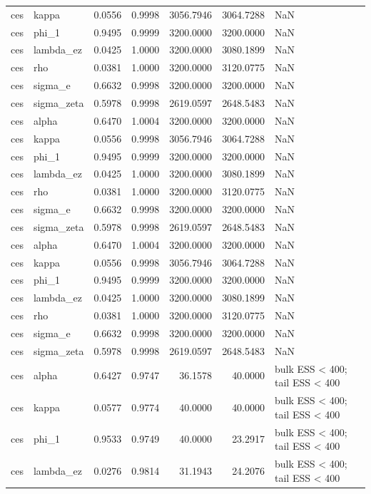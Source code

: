 \begin{tabular}{llrrrrl}
ces & kappa & 0.0556 & 0.9998 & 3056.7946 & 3064.7288 & NaN \\
ces & phi\_1 & 0.9495 & 0.9999 & 3200.0000 & 3200.0000 & NaN \\
ces & lambda\_ez & 0.0425 & 1.0000 & 3200.0000 & 3080.1899 & NaN \\
ces & rho & 0.0381 & 1.0000 & 3200.0000 & 3120.0775 & NaN \\
ces & sigma\_e & 0.6632 & 0.9998 & 3200.0000 & 3200.0000 & NaN \\
ces & sigma\_zeta & 0.5978 & 0.9998 & 2619.0597 & 2648.5483 & NaN \\
ces & alpha & 0.6470 & 1.0004 & 3200.0000 & 3200.0000 & NaN \\
ces & kappa & 0.0556 & 0.9998 & 3056.7946 & 3064.7288 & NaN \\
ces & phi\_1 & 0.9495 & 0.9999 & 3200.0000 & 3200.0000 & NaN \\
ces & lambda\_ez & 0.0425 & 1.0000 & 3200.0000 & 3080.1899 & NaN \\
ces & rho & 0.0381 & 1.0000 & 3200.0000 & 3120.0775 & NaN \\
ces & sigma\_e & 0.6632 & 0.9998 & 3200.0000 & 3200.0000 & NaN \\
ces & sigma\_zeta & 0.5978 & 0.9998 & 2619.0597 & 2648.5483 & NaN \\
ces & alpha & 0.6470 & 1.0004 & 3200.0000 & 3200.0000 & NaN \\
ces & kappa & 0.0556 & 0.9998 & 3056.7946 & 3064.7288 & NaN \\
ces & phi\_1 & 0.9495 & 0.9999 & 3200.0000 & 3200.0000 & NaN \\
ces & lambda\_ez & 0.0425 & 1.0000 & 3200.0000 & 3080.1899 & NaN \\
ces & rho & 0.0381 & 1.0000 & 3200.0000 & 3120.0775 & NaN \\
ces & sigma\_e & 0.6632 & 0.9998 & 3200.0000 & 3200.0000 & NaN \\
ces & sigma\_zeta & 0.5978 & 0.9998 & 2619.0597 & 2648.5483 & NaN \\
ces & alpha & 0.6427 & 0.9747 & 36.1578 & 40.0000 & bulk ESS < 400; tail ESS < 400 \\
ces & kappa & 0.0577 & 0.9774 & 40.0000 & 40.0000 & bulk ESS < 400; tail ESS < 400 \\
ces & phi\_1 & 0.9533 & 0.9749 & 40.0000 & 23.2917 & bulk ESS < 400; tail ESS < 400 \\
ces & lambda\_ez & 0.0276 & 0.9814 & 31.1943 & 24.2076 & bulk ESS < 400; tail ESS < 400 \\

\end{tabular}
